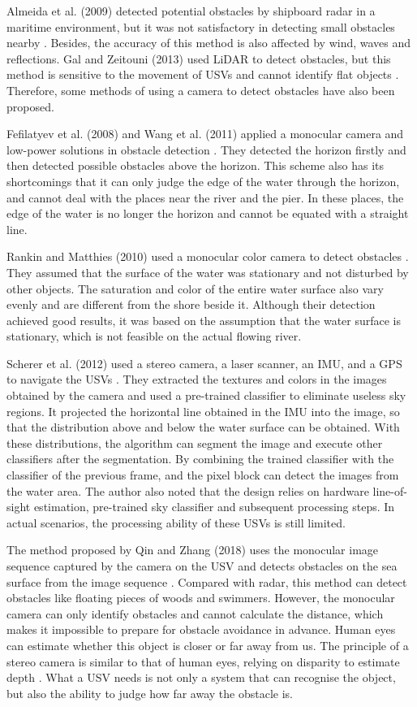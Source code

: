 \documentclass[sensors,article,submit,moreauthors,pdftex]{Definitions/mdpi}
\begin{document}
Almeida et al. (2009) detected potential obstacles by shipboard radar in a maritime environment, but it was not satisfactory in detecting small obstacles nearby \cite{5278238}. Besides, the accuracy of this method is also affected by wind, waves and reflections. Gal and Zeitouni (2013) used LiDAR to detect obstacles, but this method is sensitive to the movement of USVs and cannot identify flat objects \cite{sauze_tracking_2013}. Therefore, some methods of using a camera to detect obstacles have also been proposed. 

Fefilatyev et al. (2008) and Wang et al. (2011) applied a monocular camera and low-power solutions in obstacle detection \cite{4761344, 6070512}. They detected the horizon firstly and then detected possible obstacles above the horizon. This scheme also has its shortcomings that it can only judge the edge of the water through the horizon, and cannot deal with the places near the river and the pier. In these places, the edge of the water is no longer the horizon and cannot be equated with a straight line.

Rankin and Matthies (2010) used a monocular color camera to detect obstacles \cite{5650402}. They assumed that the surface of the water was stationary and not disturbed by other objects. The saturation and color of the entire water surface also vary evenly and are different from the shore beside it.
Although their detection achieved good results, it was based on the assumption that the water surface is stationary, which is not feasible on the actual flowing river.

Scherer et al. (2012) used a stereo camera, a laser scanner, an IMU, and a GPS to navigate the USVs \cite{scherer_river_2012}. They extracted the textures and colors in the images obtained by the camera and used a pre-trained classifier to eliminate useless sky regions. It projected the horizontal line obtained in the IMU into the image, so that the distribution above and below the water surface can be obtained. With these distributions, the algorithm can segment the image and execute other classifiers after the segmentation. By combining the trained classifier with the classifier of the previous frame, and the pixel block can detect the images from the water area. The author also noted that the design relies on hardware line-of-sight estimation, pre-trained sky classifier and subsequent processing steps. In actual scenarios, the processing ability of these USVs is still limited.


The method proposed by Qin and Zhang (2018) uses the monocular image sequence captured by the camera on the USV and detects obstacles on the sea surface from the image sequence \cite{qin2018robust}. Compared with radar, this method can detect obstacles like floating pieces of woods and swimmers. However, the monocular camera can only identify obstacles and cannot calculate the distance, which makes it impossible to prepare for obstacle avoidance in advance. Human eyes can estimate whether this object is closer or far away from us. The principle of a stereo camera is similar to that of human eyes, relying on disparity to estimate depth \cite{mustafah2012stereo}. What a USV needs is not only a system that can recognise the object, but also the ability to judge how far away the obstacle is.
\end{document}
